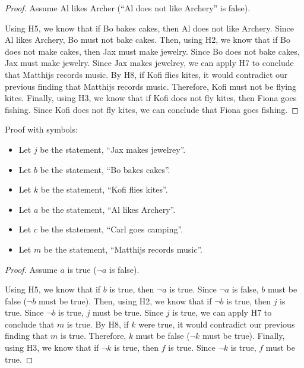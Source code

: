\documentclass{article}
\begin{document}
\begin{enumerate}
          \begin{proof}
              Assume Al likes Archer (``Al does not like Archery'' is false).

              Using H5, we know that if Bo bakes cakes, then Al does not like Archery. Since
              Al likes Archery, Bo must not bake cakes.
              Then, using H2, we know that if Bo does not make cakes, then Jax must make
              jewelry. Since Bo does not bake cakes, Jax must make jewelry.
              Since Jax makes jewelrey, we can apply H7 to conclude that Matthijs records
              music.
              By H8, if Kofi flies kites, it would contradict our previous finding that
              Matthijs records music. Therefore, Kofi must not be flying kites.
              Finally, using H3, we know that if Kofi does not fly kites, then Fiona goes
              fishing. Since Kofi does not fly kites, we can conclude that Fiona goes
              fishing.

          \end{proof}

          Proof with symbols:

          \begin{itemize}
              \item Let $j$ be the statement, ``Jax makes jewelrey''.
              \item Let $b$ be the statement, ``Bo bakes cakes''.
              \item Let $k$ be the statement, ``Kofi flies kites''.
              \item Let $a$ be the statement, ``Al likes Archery''.
              \item Let $c$ be the statement, ``Carl goes camping''.
              \item Let $m$ be the statement, ``Matthijs records music''.

          \end{itemize}

          \begin{proof}
              Assume $a$ is true ($\neg a$ is false).

              Using H5, we know that if $b$ is true, then $\neg a$ is true. Since $\neg a$ is
              false, $b$ must be false ($\neg b$ must be true).
              Then, using H2, we know that if $\neg b$ is true, then $j$ is true. Since $\neg
              b$ is true, $j$ must be true.
              Since $j$ is true, we can apply H7 to conclude that $m$ is true.
              By H8, if $k$ were true, it would contradict our previous finding that $m$ is
              true. Therefore, $k$ must be false ($\neg k$ must be true).
              Finally, using H3, we know that if $\neg k$ is true, then $f$ is true. Since
              $\neg k$ is true, $f$ must be true.


\end{proof}
\end{enumerate}
\end{document}
